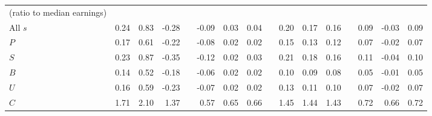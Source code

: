 \begin{tabular}{lrrrrrrrrrrrrrrr}
(ratio to median earnings) &       &       &       &       &       &       &       &       &       &       &       &       &       &       &  \\
\quad All $s$ & 0.24  & 0.83  & -0.28 &       & -0.09 & 0.03  & 0.04  &       & 0.20  & 0.17  & 0.16  &       & 0.09  & -0.03 & 0.09 \\
\quad $P$ & 0.17  & 0.61  & -0.22 &       & -0.08 & 0.02  & 0.02  &       & 0.15  & 0.13  & 0.12  &       & 0.07  & -0.02 & 0.07 \\
\quad $S$ & 0.23  & 0.87  & -0.35 &       & -0.12 & 0.02  & 0.03  &       & 0.21  & 0.18  & 0.16  &       & 0.11  & -0.04 & 0.10 \\
\quad $B$ & 0.14  & 0.52  & -0.18 &       & -0.06 & 0.02  & 0.02  &       & 0.10  & 0.09  & 0.08  &       & 0.05  & -0.01 & 0.05 \\
\quad $U$ & 0.16  & 0.59  & -0.23 &       & -0.07 & 0.02  & 0.02  &       & 0.13  & 0.11  & 0.10  &       & 0.07  & -0.02 & 0.07 \\
\quad $C$ & 1.71  & 2.10  & 1.37  &       & 0.57  & 0.65  & 0.66  &       & 1.45  & 1.44  & 1.43  &       & 0.72  & 0.66  & 0.72 \\
\bottomrule
\end{tabular}%
